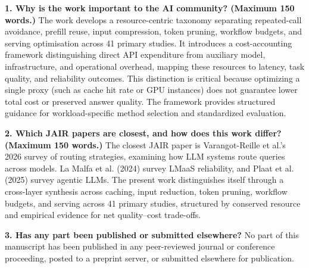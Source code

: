 \IfFileExists{jair.cls}{\documentclass{jair}}{\documentclass[manuscript,nonacm,screen]{acmart}}
\begin{document}
\textbf{1. Why is the work important to the AI community? (Maximum 150 words.)}
The work develops a resource-centric taxonomy separating repeated-call avoidance, prefill reuse, input compression, token pruning, workflow budgets, and serving optimisation across 41 primary studies. It introduces a cost-accounting framework distinguishing direct API expenditure from auxiliary model, infrastructure, and operational overhead, mapping these resources to latency, task quality, and reliability outcomes. This distinction is critical because optimizing a single proxy (such as cache hit rate or GPU instances) does not guarantee lower total cost or preserved answer quality. The framework provides structured guidance for workload-specific method selection and standardized evaluation.

\textbf{2. Which JAIR papers are closest, and how does this work differ? (Maximum 150 words.)}
The closest JAIR paper is Varangot-Reille et al.'s 2026 survey of routing strategies, examining how LLM systems route queries across models. La Malfa et al. (2024) survey LMaaS reliability, and Plaat et al. (2025) survey agentic LLMs. The present work distinguishes itself through a cross-layer synthesis across caching, input reduction, token pruning, workflow budgets, and serving across 41 primary studies, structured by conserved resource and empirical evidence for net quality--cost trade-offs.

\textbf{3. Has any part been published or submitted elsewhere?}
No part of this manuscript has been published in any peer-reviewed journal or conference proceeding, posted to a preprint server, or submitted elsewhere for publication.

\makeatletter
\def\shownote#1{\unskip}
\renewenvironment{thebibliography}[1]{%
  \@bibtitlestyle
  \normalfont\bibliofont\labelsep .5em\relax
  \renewcommand\theenumiv{\arabic{enumiv}}\let\p@enumiv\@empty
  \list{\@biblabel{\theenumiv}}{%
    \settowidth\labelwidth{\@biblabel{#1}}%
    \leftmargin\labelwidth \advance\leftmargin\labelsep
    \usecounter{enumiv}%
    \setlength{\itemsep}{2pt plus 0.5pt minus 0.5pt}%
    \setlength{\parsep}{0pt}%
  }%
  \sloppy \clubpenalty 4000 \widowpenalty 4000
  \sfcode`\.=\@m
}{%
  \def\@noitemerr{\@latex@warning{Empty `thebibliography' environment}}%
  \endlist
}
\makeatother

\nocite{S01,S02,S03,S04,S05,S06,S07,S08,S09,S10,S11,S12,S13,S14,S15,S16,S17,S18,S19,S20,S21,S22,S23,S24,S25,S26,S27,S28,S29,S30,S31,S32,S33,S34,S35,S36,S37,S38,S39,S40,S41,FrugalGPT,HybridLLM,RouterBench,RouteLLM,UnifiedRouting,BESTRoute,SelectThenRoute,JAIRRoutingSurvey,JAIRLMaaS,JAIRAgentic,PRISMA,Kitchenham,GundersenJAIR}


\end{document}
